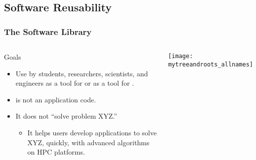  

\subsection{Software Reusability}
\frame
{
  \frametitle{The \libmesh{} Software Library}

\begin{columns}
  \begin{block}{\libMesh{} Goals}
    \begin{itemize}
      \item Use by students, researchers, scientists, and engineers as a tool for  or as a tool for .
      \item \libMesh{} is not an application code.
      \item It does not ``solve problem XYZ.''
        \begin{itemize}
          \item It helps users develop applications to solve XYZ,
              quickly, with advanced algorithms on HPC platforms.
        \end{itemize}
    \end{itemize}    
  \end{block}
  \begin{center}
    \texttt{[image: mytreeandroots\_allnames]}
  \end{center}
\end{columns}
} 


